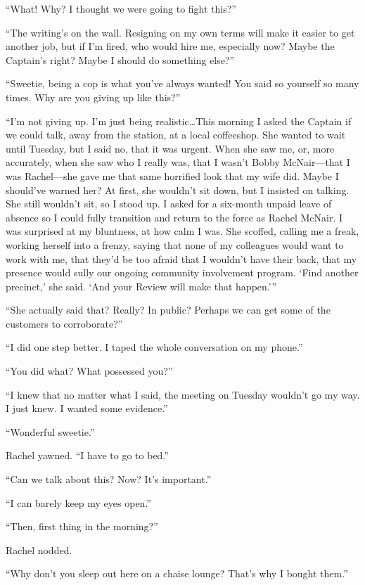 ``What! Why? I thought we were going to fight this?''

``The writing's on the wall. Resigning on my own terms will make it
easier to get another job, but if I'm fired, who would hire me,
especially now? Maybe the Captain's right? Maybe I should do something
else?''

``Sweetie, being a cop is what you've always wanted! You said so
yourself so many times. Why are you giving up like this?''

``I'm not giving up. I'm just being realistic\ldots This morning I asked
the Captain if we could talk, away from the station, at a local
coffeeshop. She wanted to wait until Tuesday, but I said no, that it was
urgent. When she saw me, or, more accurately, when she saw who I really
was, that I wasn't Bobby McNair---that I was Rachel---she gave me that
same horrified look that my wife did. Maybe I should've warned her? At
first, she wouldn't sit down, but I insisted on talking. She still
wouldn't sit, so I stood up. I asked for a six-month unpaid leave of
absence so I could fully transition and return to the force as Rachel
McNair. I was surprised at my bluntness, at how calm I was. She scoffed,
calling me a freak, working herself into a frenzy, saying that none of
my colleagues would want to work with me, that they'd be too afraid that
I wouldn't have their back, that my presence would sully our ongoing
community involvement program. `Find another precinct,' she said. `And
your Review will make that happen.'''

``She actually said that? Really? In public? Perhaps we can get some of
the customers to corroborate?''

``I did one step better. I taped the whole conversation on my phone.''

``You did what? What possessed you?''

``I knew that no matter what I said, the meeting on Tuesday wouldn't go
my way. I just knew. I wanted some evidence.''

``Wonderful sweetie.''

Rachel yawned. ``I have to go to bed.''

``Can we talk about this? Now? It's important.''

``I can barely keep my eyes open.''

``Then, first thing in the morning?''

Rachel nodded.

``Why don't you sleep out here on a chaise lounge? That's why I bought
them.''


